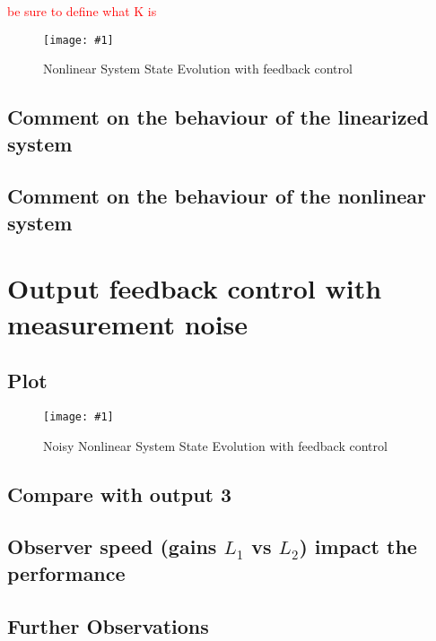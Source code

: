 \documentclass[10pt]{article}
\newcommand{\shrinkimage}[1]{\texttt{[image: \#1]}}
\begin{document}
\textcolor{red}{be sure to define what K is}

\begin{figure}[b]
    \centering
    \shrinkimage{lab4/figs/nlin_noiseless_state_est_error_feedback.pdf}
    \caption{Nonlinear System State Evolution with feedback control}
    \label{fig:nlin_noiseless_state_est_error_feedback}
\end{figure}

\subsection{Comment on the behaviour of the linearized system}
\subsection{Comment on the behaviour of the nonlinear system}

\section{Output feedback control with measurement noise}

\subsection{Plot}
\begin{figure}[b]
    \centering
    \shrinkimage{lab4/figs/nlin_noisy_state_est_error_feedback.pdf}
    \caption{Noisy Nonlinear System State Evolution with feedback control}
    \label{fig:nlin_noisy_state_est_error_feedback}
\end{figure}

\subsection{Compare with output 3}
\subsection{Observer speed (gains \texorpdfstring{$L_1$}{L1} vs \texorpdfstring{$L_2$}{L2}) impact the performance}

\subsection{Further Observations}
\end{document}
